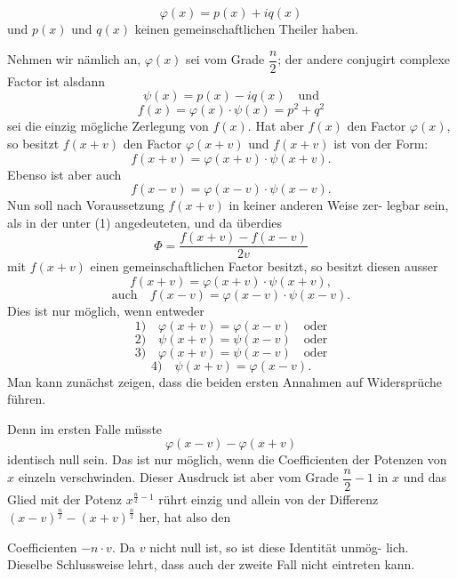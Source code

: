 \documentclass[11pt]{article}
\providecommand{\weberpage}[1]{}
\providecommand{\weq}[2]{\begin{equation}\tag{#1}#2\end{equation}}
\let\Phi\varPhi
\begin{document}
\[ \varphi(x) = p(x) + iq(x) \]
und $p(x)$ und $q(x)$ keinen gemeinschaftlichen Theiler haben.

Nehmen wir nämlich an, $\varphi(x)$ sei vom Grade $\dfrac{n}{2}$; der andere
conjugirt complexe Factor ist alsdann
\[ \psi(x) = p(x) - iq(x) \quad \text{und} \]
\weq{1}{f(x) = \varphi(x) \cdot \psi(x) = p^2 + q^2}
sei die einzig mögliche Zerlegung von $f(x)$. Hat aber $f(x)$ den Factor
$\varphi(x)$, so besitzt $f(x+v)$ den Factor $\varphi(x+v)$ und $f(x+v)$ ist von
der Form:
\weq{2}{f(x+v) = \varphi(x+v) \cdot \psi(x+v).}
Ebenso ist aber auch
\weq{3}{f(x-v) = \varphi(x-v) \cdot \psi(x-v).}
Nun soll nach Voraussetzung $f(x+v)$ in keiner anderen Weise zer-
legbar sein, als in der unter (1) angedeuteten, und da überdies
\[ \Phi = \frac{f(x+v) - f(x-v)}{2v} \]
mit $f(x+v)$ einen gemeinschaftlichen Factor besitzt, so besitzt
diesen ausser
\[ f(x+v) = \varphi(x+v) \cdot \psi(x+v), \]
\[ \text{auch} \quad f(x-v) = \varphi(x-v) \cdot \psi(x-v). \]
Dies ist nur möglich, wenn entweder
\[ 1) \quad \varphi(x+v) = \varphi(x-v) \quad \text{oder} \]
\[ 2) \quad \psi(x+v) = \psi(x-v) \quad \text{oder} \]
\[ 3) \quad \varphi(x+v) = \psi(x-v) \quad \text{oder} \]
\[ 4) \quad \psi(x+v) = \varphi(x-v). \]
Man kann zunächst zeigen, dass die beiden ersten Annahmen auf
Widersprüche führen.

Denn im ersten Falle müsste
\[ \varphi(x-v) - \varphi(x+v) \]
identisch null sein. Das ist nur möglich, wenn die Coefficienten der
Potenzen von $x$ einzeln verschwinden. Dieser Ausdruck ist aber vom
Grade $\dfrac{n}{2} - 1$ in $x$ und das Glied mit der Potenz $x^{\frac{n}{2}-1}$ rührt einzig
und allein von der Differenz $(x-v)^{\frac{n}{2}} - (x+v)^{\frac{n}{2}}$ her, hat also den


\weberpage{173}

Coefficienten $-n \cdot v$. Da $v$ nicht null ist, so ist diese Identität unmög-
lich. Dieselbe Schlussweise lehrt, dass auch der zweite Fall nicht
eintreten kann.
\end{document}
